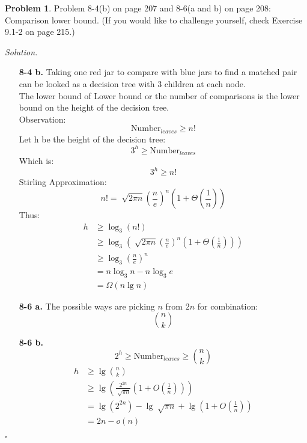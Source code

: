 \documentclass[11pt]{article}
\theoremstyle{definition}
\newtheorem{problem}{Problem}
\newenvironment{solution}{\noindent\emph{Solution.}}{\hfill$\square$}
\begin{document}
\newpage



\begin{problem}
Problem 8-4(b) on page 207 and 8-6(a and b) on page 208: Comparison lower bound. (If you would like to challenge yourself, check Exercise 9.1-2 on page 215.) 
\end{problem}

\begin{solution}
\begin{enumerate}
    \item[\textbf{8-4 b.}]
    Taking one red jar to compare with blue jars to find a matched pair can be looked as a decision tree with $3$ children at each node.\\
    The lower bound of Lower bound or the number of comparisons is the lower bound on the height of the decision tree.\\
    Observation:
    $$\mbox{Number}_{leaves} \geq n!$$
    Let h be the height of the decision tree:
    $$3^h \geq \mbox{Number}_{leaves} $$
    Which is:
    $$3^h \geq n!$$
    Stirling Approximation:
    $$n! = \sqrt[]{2\pi n}\left(\frac{n}{e}\right)^n\left(1 + \Theta\left(\frac{1}{n}\right)\right)$$
    Thus:
    \begin{align*}
    h &\geq \log_3(n!) \\
    &\geq \log_3\left(\sqrt[]{2\pi n}\left(\frac{n}{e}\right)^n\left(1 + \Theta\left(\frac{1}{n}\right)\right)\right) \\
   &\geq \log_3\left(\frac{n}{e}\right)^n \\
    &= n\log_3n - n\log_3e\\
    &=\Omega(n\lg n)
    \end{align*}
    
    
    

    \item[\textbf{8-6 a.}]
    The possible ways are picking $n$ from $2n$ for combination:
    $$\binom nk$$
    
    \item[\textbf{8-6 b.}]
    $$2^h \geq \mbox{Number}_{leaves} \geq \binom nk$$
    \begin{align*}
    h &\geq \lg \binom nk \\
    &\geq \lg\left(  \frac{2^{2n}}{\sqrt[]{\pi n}} \left(       1 + O\left(    \frac{1}{n}    \right)         \right)      \right) \\
    &= \lg(2^{2n}) - \lg \sqrt[]{\pi n} + \lg \left(       1 + O\left(    \frac{1}{n}    \right)    \right)   \\
    &= 2n - o(n)
    \end{align*}

  \end{enumerate}
\end{solution}
\end{document}
